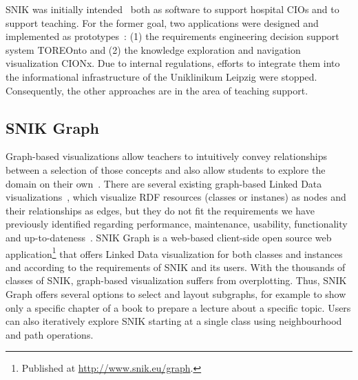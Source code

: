\documentclass{IOS-Book-Article}     %
\newcommand{\citep}{\cite}%
\begin{document}
SNIK was initially intended~\citep{domaene} both as  software to support hospital CIOs and to support teaching.
For the former goal, two applications were designed and implemented as prototypes~\citep{toreonto}: (1) the requirements engineering decision support system TOREOnto and (2) the knowledge exploration and navigation visualization CIONx.
Due to internal regulations, efforts to integrate them into the informational infrastructure of the Uniklinikum Leipzig were stopped.
Consequently, the other approaches are in the area of teaching support.


\subsection{SNIK Graph}\label{sec:snik-graph}

Graph-based visualizations allow teachers to intuitively convey relationships between a selection of those concepts and also allow students to explore the domain on their own~\cite{ontologybased}.
There are several existing graph-based Linked Data visualizations~\cite{linkeddatavisualization}, which visualize RDF resources (classes or instanes) as nodes and their relationships as edges, but they do not fit the requirements we have previously identified regarding performance, maintenance, usability, functionality and up-to-dateness~\cite{visualizationoflargeontologies}.
SNIK Graph is a web-based client-side open source web application\footnote{Published at \url{http://www.snik.eu/graph}.} that offers Linked Data visualization for both classes and instances and according to the requirements of SNIK and its users.
With the thousands of classes of SNIK, graph-based visualization suffers from overplotting.
Thus, SNIK Graph offers several options to select and layout subgraphs, for example to show only a specific chapter of a book to prepare a lecture about a specific topic.
Users can also iteratively explore SNIK starting at a single class using neighbourhood and path operations. %
\end{document}
